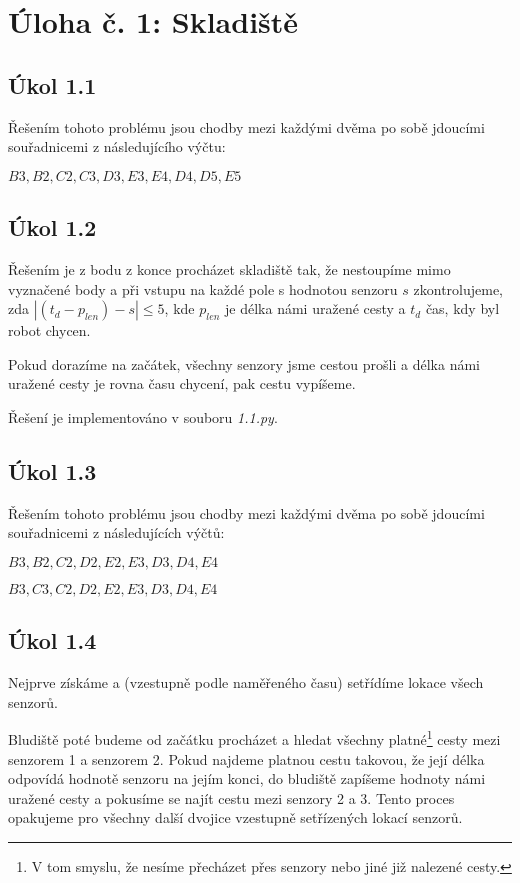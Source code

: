 \documentclass[a4paper, 12pt]{article}
\begin{document}
  \section*{Úloha č. 1: Skladiště}

  \subsection*{Úkol 1.1}
  Řešením tohoto problému jsou chodby mezi každými dvěma po sobě jdoucími souřadnicemi z následujícího výčtu:

  \begin{center}
    $B3, B2, C2, C3, D3, E3, E4, D4, D5, E5$
  \end{center}

  \subsection*{Úkol 1.2}
  Řešením je z bodu z konce procházet skladiště tak, že nestoupíme mimo vyznačené body a při vstupu na každé pole s hodnotou senzoru $s$ zkontrolujeme, zda $|(t_d - p_{len}) - s| \le 5$, kde $p_{len}$ je délka námi uražené cesty a $t_d$ čas, kdy byl robot chycen.

  Pokud dorazíme na začátek, všechny senzory jsme cestou prošli a délka námi uražené cesty je rovna času chycení, pak cestu vypíšeme.

  Řešení je implementováno v souboru \textit{1.1.py}.

  \subsection*{Úkol 1.3}
  Řešením tohoto problému jsou chodby mezi každými dvěma po sobě jdoucími souřadnicemi z následujících výčtů:

  \begin{center}
    $B3, B2, C2, D2, E2, E3, D3, D4, E4$

    $B3, C3, C2, D2, E2, E3, D3, D4, E4$
  \end{center}

  \subsection*{Úkol 1.4}
  Nejprve získáme a (vzestupně podle naměřeného času) setřídíme lokace všech senzorů.

  Bludiště poté budeme od začátku procházet a hledat všechny platné\footnote{V tom smyslu, že nesíme přecházet přes senzory nebo jiné již nalezené cesty.} cesty mezi senzorem 1 a senzorem 2. Pokud najdeme platnou cestu takovou, že její délka odpovídá hodnotě senzoru na jejím konci, do bludiště zapíšeme hodnoty námi uražené cesty a pokusíme se najít cestu mezi senzory 2 a 3. Tento proces opakujeme pro všechny další dvojice vzestupně setřízených lokací senzorů.
\end{document}
